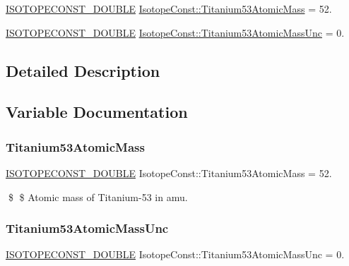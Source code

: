 \begin{DoxyCompactItemize}
\item 
\mbox{\hyperlink{group___isotope_const-_macros_ga8f45a7272ce02c0b4c65c44636ed719a}{I\+S\+O\+T\+O\+P\+E\+C\+O\+N\+S\+T\+\_\+\+D\+O\+U\+B\+LE}} \mbox{\hyperlink{group___isotope_const-_titanium-_ti53_ga55474b1916d6f7d01fb05084c09ea245}{Isotope\+Const\+::\+Titanium53\+Atomic\+Mass}} = 52.
\item 
\mbox{\hyperlink{group___isotope_const-_macros_ga8f45a7272ce02c0b4c65c44636ed719a}{I\+S\+O\+T\+O\+P\+E\+C\+O\+N\+S\+T\+\_\+\+D\+O\+U\+B\+LE}} \mbox{\hyperlink{group___isotope_const-_titanium-_ti53_gae1f78fbd2fab404016ebcc4c0fb56543}{Isotope\+Const\+::\+Titanium53\+Atomic\+Mass\+Unc}} = 0.
\end{DoxyCompactItemize}


\subsection{Detailed Description}


\subsection{Variable Documentation}
\mbox{\label{group___isotope_const-_titanium-_ti53_ga55474b1916d6f7d01fb05084c09ea245}} 
\subsubsection{\texorpdfstring{Titanium53\+Atomic\+Mass}{Titanium53AtomicMass}}
{\footnotesize\ttfamily \mbox{\hyperlink{group___isotope_const-_macros_ga8f45a7272ce02c0b4c65c44636ed719a}{I\+S\+O\+T\+O\+P\+E\+C\+O\+N\+S\+T\+\_\+\+D\+O\+U\+B\+LE}} Isotope\+Const\+::\+Titanium53\+Atomic\+Mass = 52.}

\$ \$ Atomic mass of Titanium-\/53 in amu. \mbox{\label{group___isotope_const-_titanium-_ti53_gae1f78fbd2fab404016ebcc4c0fb56543}} 
\subsubsection{\texorpdfstring{Titanium53\+Atomic\+Mass\+Unc}{Titanium53AtomicMassUnc}}
{\footnotesize\ttfamily \mbox{\hyperlink{group___isotope_const-_macros_ga8f45a7272ce02c0b4c65c44636ed719a}{I\+S\+O\+T\+O\+P\+E\+C\+O\+N\+S\+T\+\_\+\+D\+O\+U\+B\+LE}} Isotope\+Const\+::\+Titanium53\+Atomic\+Mass\+Unc = 0.}

